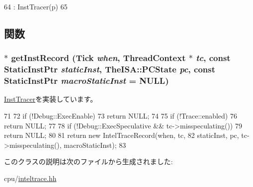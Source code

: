 \begin{DoxyCode}
64                                           : InstTracer(p)
65     {}
\end{DoxyCode}


\subsection{関数}
\hypertarget{classTrace_1_1IntelTrace_a244eaae9f6eb0042457439e5ad31c8f5}{
\subsubsection[{getInstRecord}]{$\ast$ getInstRecord ({\bf Tick} {\em when}, \/  {\bf ThreadContext} $\ast$ {\em tc}, \/  const {\bf StaticInstPtr} {\em staticInst}, \/  TheISA::PCState {\em pc}, \/  const {\bf StaticInstPtr} {\em macroStaticInst} = {\ttfamily NULL})}}
\label{classTrace_1_1IntelTrace_a244eaae9f6eb0042457439e5ad31c8f5}


\hyperlink{classTrace_1_1InstTracer_a4891aa2e596bcb475928d8fe1766a9df}{InstTracer}を実装しています。


\begin{DoxyCode}
71     {
72         if (!Debug::ExecEnable)
73             return NULL;
74 
75         if (!Trace::enabled)
76             return NULL;
77 
78         if (!Debug::ExecSpeculative && tc->misspeculating())
79             return NULL;
80 
81         return new IntelTraceRecord(when, tc,
82                 staticInst, pc, tc->misspeculating(), macroStaticInst);
83     }
\end{DoxyCode}


このクラスの説明は次のファイルから生成されました:\begin{DoxyCompactItemize}
\item 
cpu/\hyperlink{inteltrace_8hh}{inteltrace.hh}\end{DoxyCompactItemize}
